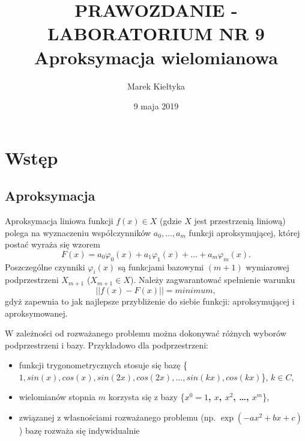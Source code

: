 

\renewcommand{\arraystretch}{1.2}

\title{\Large\vspace{-2.5cm}{\Huge S}PRAWOZDANIE - LABORATORIUM NR {\Huge9}\\
	\textbf{Aproksymacja wielomianowa} } 
\date{\Large9 maja 2019}
\author{\Large Marek Kiełtyka}


\maketitle

\vspace{-1.2cm}\section{Wstęp}

\subsection{Aproksymacja}
Aproksymacja liniowa funkcji $f(x) \in X$ (gdzie $X$ jest przestrzenią liniową) polega na wyznaczeniu współczynników $a_0,  \dots, a_m$ funkcji aproksymującej, której postać wyraża się wzorem
\begin{equation}
F(x) = a_0 \varphi_0(x) + a_1 \varphi_1(x) + \dots + a_m \varphi_m(x).
\label{aproks}
\end{equation}
Poszczególne czynniki $\varphi_i(x)$ są funkcjami bazowymi $(m+1)$ wymiarowej podprzestrzeni $X_{m+1}$ ($X_{m+1} \in X$).
Należy zagwarantować spełnienie warunku 
\begin{equation}
||f(x) - F(x)|| = minimum,
\end{equation}
gdyż zapewnia to jak najlepsze przybliżenie do siebie funkcji: aproksymującej i aproksymowanej.

W zależności od rozważanego problemu można dokonywać różnych wyborów podprzestrzeni i bazy. Przykładowo dla podprzestrzeni:
\begin{itemize}
	\item funkcji trygonometrycznych stosuje się bazę \{$1, sin(x), cos(x), sin(2x), cos(2x), \dots, sin(kx), cos(kx)$\}, $k\in C $,
	\item wielomianów stopnia $ m $ korzysta się z bazy \{\textbf{$ x^0 = 1$, $x$, $x^2$, \dots, $x^m$}\},
	\item związanej z własnościami rozważanego problemu (np. $\exp(-ax^2 + bx + c)$ ) bazę rozważa się indywidualnie
\end{itemize}
